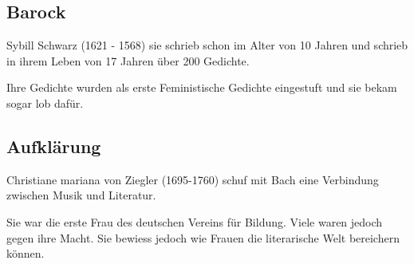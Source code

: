 \documentclass{article}
\begin{document}
\subsection{Barock}
Sybill Schwarz (1621 - 1568) sie schrieb schon im Alter von 10 Jahren und schrieb in ihrem Leben von 17 Jahren über 200 Gedichte.

Ihre Gedichte wurden als erste Feministische Gedichte eingestuft und sie bekam sogar lob dafür.

\subsection{Aufklärung}
Christiane mariana von Ziegler (1695-1760) schuf mit Bach eine Verbindung zwischen Musik und Literatur.

Sie war die erste Frau des deutschen Vereins für Bildung. Viele waren jedoch gegen ihre Macht. Sie bewiess jedoch wie Frauen die literarische Welt bereichern können.
\end{document}
